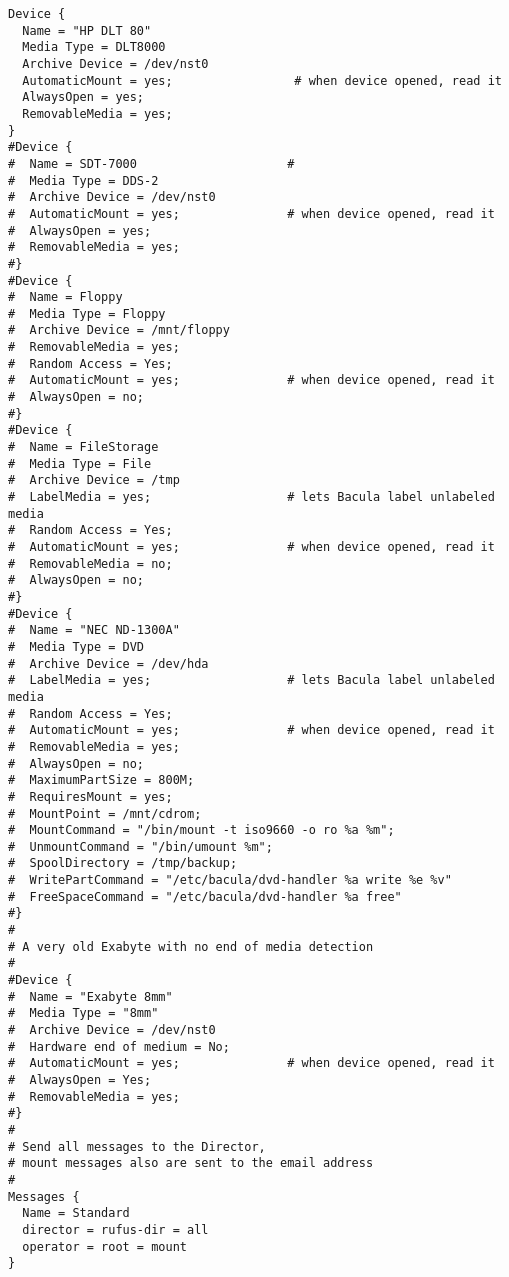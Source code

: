 \begin{verbatim}
Device {
  Name = "HP DLT 80"
  Media Type = DLT8000
  Archive Device = /dev/nst0
  AutomaticMount = yes;                 # when device opened, read it
  AlwaysOpen = yes;
  RemovableMedia = yes;
}
#Device {
#  Name = SDT-7000                     #
#  Media Type = DDS-2
#  Archive Device = /dev/nst0
#  AutomaticMount = yes;               # when device opened, read it
#  AlwaysOpen = yes;
#  RemovableMedia = yes;
#}
#Device {
#  Name = Floppy
#  Media Type = Floppy
#  Archive Device = /mnt/floppy
#  RemovableMedia = yes;
#  Random Access = Yes;
#  AutomaticMount = yes;               # when device opened, read it
#  AlwaysOpen = no;
#}
#Device {
#  Name = FileStorage
#  Media Type = File
#  Archive Device = /tmp
#  LabelMedia = yes;                   # lets Bacula label unlabeled media
#  Random Access = Yes;
#  AutomaticMount = yes;               # when device opened, read it
#  RemovableMedia = no;
#  AlwaysOpen = no;
#}
#Device {
#  Name = "NEC ND-1300A"
#  Media Type = DVD
#  Archive Device = /dev/hda
#  LabelMedia = yes;                   # lets Bacula label unlabeled media
#  Random Access = Yes;
#  AutomaticMount = yes;               # when device opened, read it
#  RemovableMedia = yes;
#  AlwaysOpen = no;
#  MaximumPartSize = 800M;
#  RequiresMount = yes;
#  MountPoint = /mnt/cdrom;
#  MountCommand = "/bin/mount -t iso9660 -o ro %a %m";
#  UnmountCommand = "/bin/umount %m";
#  SpoolDirectory = /tmp/backup;
#  WritePartCommand = "/etc/bacula/dvd-handler %a write %e %v"
#  FreeSpaceCommand = "/etc/bacula/dvd-handler %a free"
#}
#
# A very old Exabyte with no end of media detection
#
#Device {
#  Name = "Exabyte 8mm"
#  Media Type = "8mm"
#  Archive Device = /dev/nst0
#  Hardware end of medium = No;
#  AutomaticMount = yes;               # when device opened, read it
#  AlwaysOpen = Yes;
#  RemovableMedia = yes;
#}
#
# Send all messages to the Director,
# mount messages also are sent to the email address
#
Messages {
  Name = Standard
  director = rufus-dir = all
  operator = root = mount
}
\end{verbatim}
\normalsize
